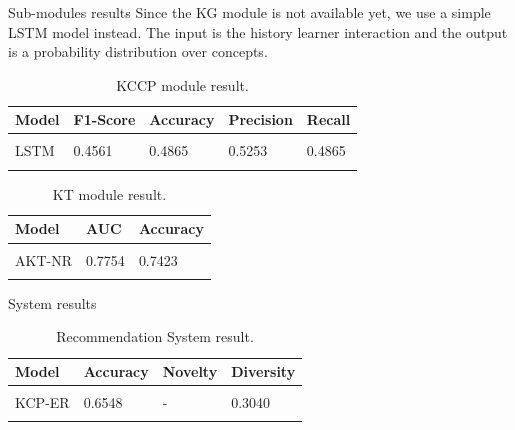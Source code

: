 \documentclass[10pt,a4paper,openany]{beamer}
\begin{document}
	\begin{frame}{Sub-modules results}
		Since the KG module is not available yet, we use a simple LSTM model instead. The input is the history learner interaction and the output is a probability distribution over concepts.
		
		\begin{table}
			\begin{tabular}{l | l | l | l | l}
				\hline
				Model & F1-Score & Accuracy & Precision & Recall\\
				\hline
				& & & & \\
				LSTM & 0.4561 & 0.4865 & 0.5253 & 0.4865\\ 
				& & & & \\
				\hline
			\end{tabular}
		\caption{KCCP module result.}
		\end{table}		
		
		\begin{table}
			\begin{tabular}{l | l | l }
				\hline
				Model & AUC & Accuracy \\
				\hline
				& & \\
				AKT-NR & 0.7754 & 0.7423\\ 
				 & & \\
				\hline
			\end{tabular}
		\caption{KT module result.}
		\end{table}
	\end{frame}
	
	\begin{frame}{System results}
		\begin{table}
			\begin{tabular}{l | l | l | l }
				\hline
				Model & Accuracy & Novelty & Diversity \\
				\hline
				& & & \\
				KCP-ER & 0.6548 & - & 0.3040 \\ 
				& & & \\
				\hline
			\end{tabular}
		\caption{Recommendation System result.}
		\end{table}
		
	\end{frame}
	
	
	
\end{document}

